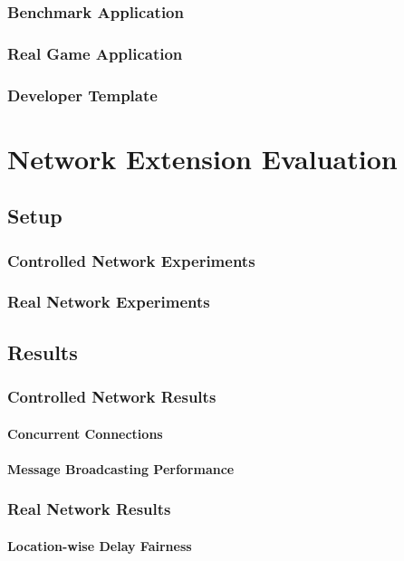 \documentclass[bsc,frontabs,twoside,singlespacing,parskip,deptreport]{infthesis}     %
\begin{document}
\subsection{Benchmark Application}
\subsection{Real Game Application}
\subsection{Developer Template}






\chapter{Network Extension Evaluation}
\section{Setup}
\subsection{Controlled Network Experiments}
\subsection{Real Network Experiments}

\section{Results}
\subsection{Controlled Network Results}
\subsubsection{Concurrent Connections}
\subsubsection{Message Broadcasting Performance}
\subsection{Real Network Results}
\subsubsection{Location-wise Delay Fairness}
\end{document}
